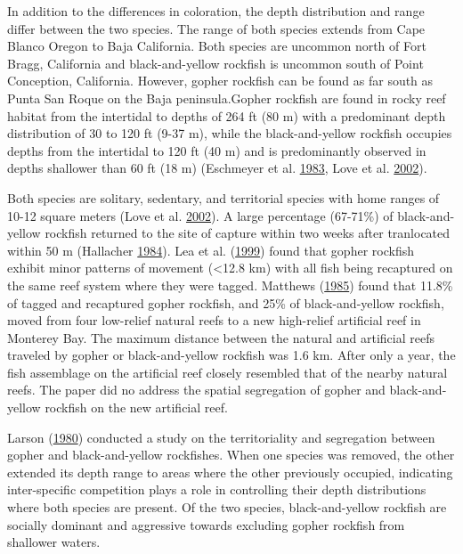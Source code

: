 \documentclass[12pt,]{article}
\begin{document}
In addition to the differences in coloration, the depth distribution and
range differ between the two species. The range of both species extends
from Cape Blanco Oregon to Baja California. Both species are uncommon
north of Fort Bragg, California and black-and-yellow rockfish is
uncommon south of Point Conception, California. However, gopher rockfish
can be found as far south as Punta San Roque on the Baja
peninsula.Gopher rockfish are found in rocky reef habitat from the
intertidal to depths of 264 ft (80 m) with a predominant depth
distribution of 30 to 120 ft (9-37 m), while the black-and-yellow
rockfish occupies depths from the intertidal to 120 ft (40 m) and is
predominantly observed in depths shallower than 60 ft (18 m) (Eschmeyer
et al. \protect\hyperlink{ref-Eschmeyer1983}{1983}, Love et al.
\protect\hyperlink{ref-Love2002}{2002}).

Both species are solitary, sedentary, and territorial species with home
ranges of 10-12 square meters (Love et al.
\protect\hyperlink{ref-Love2002}{2002}). A large percentage (67-71\%) of
black-and-yellow rockfish returned to the site of capture within two
weeks after tranlocated within 50 m (Hallacher
\protect\hyperlink{ref-Hallacher1984}{1984}). Lea et al.
(\protect\hyperlink{ref-Lea1999}{1999}) found that gopher rockfish
exhibit minor patterns of movement (\textless{}12.8 km) with all fish
being recaptured on the same reef system where they were tagged.
Matthews (\protect\hyperlink{ref-Matthews1985}{1985}) found that 11.8\%
of tagged and recaptured gopher rockfish, and 25\% of black-and-yellow
rockfish, moved from four low-relief natural reefs to a new high-relief
artificial reef in Monterey Bay. The maximum distance between the
natural and artificial reefs traveled by gopher or black-and-yellow
rockfish was 1.6 km. After only a year, the fish assemblage on the
artificial reef closely resembled that of the nearby natural reefs. The
paper did no address the spatial segregation of gopher and
black-and-yellow rockfish on the new artificial reef.

Larson (\protect\hyperlink{ref-Larson1980}{1980}) conducted a study on
the territoriality and segregation between gopher and black-and-yellow
rockfishes. When one species was removed, the other extended its depth
range to areas where the other previously occupied, indicating
inter-specific competition plays a role in controlling their depth
distributions where both species are present. Of the two species,
black-and-yellow rockfish are socially dominant and aggressive towards
excluding gopher rockfish from shallower waters.
\end{document}
